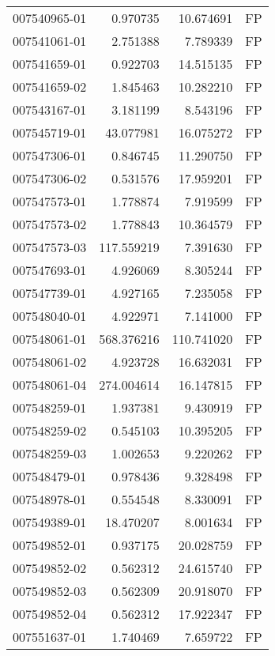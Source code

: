 \begin{tabular}{lrrl}
007540965-01 &    0.970735 &      10.674691 &   FP \\
007541061-01 &    2.751388 &       7.789339 &   FP \\
007541659-01 &    0.922703 &      14.515135 &   FP \\
007541659-02 &    1.845463 &      10.282210 &   FP \\
007543167-01 &    3.181199 &       8.543196 &   FP \\
007545719-01 &   43.077981 &      16.075272 &   FP \\
007547306-01 &    0.846745 &      11.290750 &   FP \\
007547306-02 &    0.531576 &      17.959201 &   FP \\
007547573-01 &    1.778874 &       7.919599 &   FP \\
007547573-02 &    1.778843 &      10.364579 &   FP \\
007547573-03 &  117.559219 &       7.391630 &   FP \\
007547693-01 &    4.926069 &       8.305244 &   FP \\
007547739-01 &    4.927165 &       7.235058 &   FP \\
007548040-01 &    4.922971 &       7.141000 &   FP \\
007548061-01 &  568.376216 &     110.741020 &   FP \\
007548061-02 &    4.923728 &      16.632031 &   FP \\
007548061-04 &  274.004614 &      16.147815 &   FP \\
007548259-01 &    1.937381 &       9.430919 &   FP \\
007548259-02 &    0.545103 &      10.395205 &   FP \\
007548259-03 &    1.002653 &       9.220262 &   FP \\
007548479-01 &    0.978436 &       9.328498 &   FP \\
007548978-01 &    0.554548 &       8.330091 &   FP \\
007549389-01 &   18.470207 &       8.001634 &   FP \\
007549852-01 &    0.937175 &      20.028759 &   FP \\
007549852-02 &    0.562312 &      24.615740 &   FP \\
007549852-03 &    0.562309 &      20.918070 &   FP \\
007549852-04 &    0.562312 &      17.922347 &   FP \\
007551637-01 &    1.740469 &       7.659722 &   FP \\

\end{tabular}
